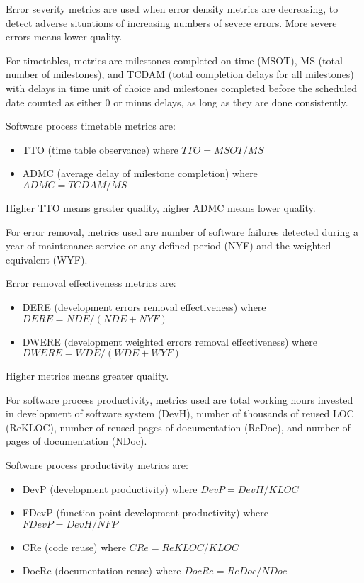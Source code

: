 \documentclass[11pt]{article}
\begin{document}
Error severity metrics are used when error density metrics are decreasing, to detect adverse situations
of increasing numbers of severe errors.
More severe errors means lower quality.

For timetables, metrics are milestones completed on time (MSOT), MS (total number of milestones),
and TCDAM (total completion delays for all milestones) with delays in time unit of choice and
milestones completed before the scheduled date counted as either 0 or minus delays, as long as
they are done consistently.

Software process timetable metrics are:
\begin{itemize}
\item TTO (time table observance) where \(TTO = MSOT/MS\)
\item ADMC (average delay of milestone completion) where \(ADMC = TCDAM / MS\)
\end{itemize}

Higher TTO means greater quality, higher ADMC means lower quality.

For error removal, metrics used are number of software failures detected during a year of maintenance
service or any defined period (NYF) and the weighted equivalent (WYF).

Error removal effectiveness metrics are:
\begin{itemize}
\item DERE (development errors removal effectiveness) where \(DERE = NDE / (NDE + NYF)\)
\item DWERE (development weighted errors removal effectiveness) where \(DWERE = WDE / (WDE + WYF)\)
\end{itemize}

Higher metrics means greater quality.

For software process productivity, metrics used are total working hours invested in development of
software system (DevH), number of thousands of reused LOC (ReKLOC), number of reused pages of
documentation (ReDoc), and number of pages of documentation (NDoc).

Software process productivity metrics are:
\begin{itemize}
\item DevP (development productivity) where \(DevP = DevH / KLOC\)
\item FDevP (function point development productivity) where \(FDevP = DevH / NFP\)
\item CRe (code reuse) where \(CRe = ReKLOC / KLOC\)
\item DocRe (documentation reuse) where \(DocRe = ReDoc / NDoc\)
\end{itemize}
\end{document}
